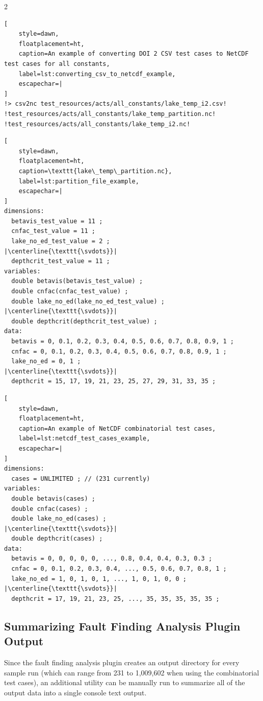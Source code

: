 \documentclass[10pt]{article}
\DeclareRobustCommand{\svdots}{%
  \vbox{
    \baselineskip=0.33333\normalbaselineskip
    \lineskiplimit=0pt
    \hbox{.}\hbox{.}\hbox{.}
    \kern-0.2\baselineskip
  }
}
\begin{document}
\begin{multicols}{2}
\begin{lstlisting}[
    style=dawn,
    floatplacement=ht,
    caption=An example of converting DOI 2 CSV test cases to NetCDF test cases for all constants,
    label=lst:converting_csv_to_netcdf_example,
    escapechar=|
]
!> csv2nc test_resources/acts/all_constants/lake_temp_i2.csv! !test_resources/acts/all_constants/lake_temp_partition.nc! !test_resources/acts/all_constants/lake_temp_i2.nc!
\end{lstlisting}

\begin{lstlisting}[
    style=dawn,
    floatplacement=ht,
    caption=\texttt{lake\_temp\_partition.nc},
    label=lst:partition_file_example,
    escapechar=|
]
dimensions:
  betavis_test_value = 11 ;
  cnfac_test_value = 11 ;
  lake_no_ed_test_value = 2 ;
|\centerline{\texttt{\svdots}}|
  depthcrit_test_value = 11 ;
variables:
  double betavis(betavis_test_value) ;
  double cnfac(cnfac_test_value) ;
  double lake_no_ed(lake_no_ed_test_value) ;
|\centerline{\texttt{\svdots}}|
  double depthcrit(depthcrit_test_value) ;
data:
  betavis = 0, 0.1, 0.2, 0.3, 0.4, 0.5, 0.6, 0.7, 0.8, 0.9, 1 ;
  cnfac = 0, 0.1, 0.2, 0.3, 0.4, 0.5, 0.6, 0.7, 0.8, 0.9, 1 ;
  lake_no_ed = 0, 1 ;
|\centerline{\texttt{\svdots}}|
  depthcrit = 15, 17, 19, 21, 23, 25, 27, 29, 31, 33, 35 ;
\end{lstlisting}

\begin{lstlisting}[
    style=dawn,
    floatplacement=ht,
    caption=An example of NetCDF combinatorial test cases,
    label=lst:netcdf_test_cases_example,
    escapechar=|
]
dimensions:
  cases = UNLIMITED ; // (231 currently)
variables:
  double betavis(cases) ;
  double cnfac(cases) ;
  double lake_no_ed(cases) ;
|\centerline{\texttt{\svdots}}|
  double depthcrit(cases) ;
data:
  betavis = 0, 0, 0, 0, 0, ..., 0.8, 0.4, 0.4, 0.3, 0.3 ;
  cnfac = 0, 0.1, 0.2, 0.3, 0.4, ..., 0.5, 0.6, 0.7, 0.8, 1 ;
  lake_no_ed = 1, 0, 1, 0, 1, ..., 1, 0, 1, 0, 0 ;
|\centerline{\texttt{\svdots}}|
  depthcrit = 17, 19, 21, 23, 25, ..., 35, 35, 35, 35, 35 ;
\end{lstlisting}

\subsection{Summarizing Fault Finding Analysis Plugin Output}
Since the fault finding analysis plugin creates an output directory for every sample run (which can range from 231 to 1,009,602 when using the combinatorial test cases), an additional utility can be manually run to summarize all of the output data into a single console text output.


\end{multicols}
\end{document}
